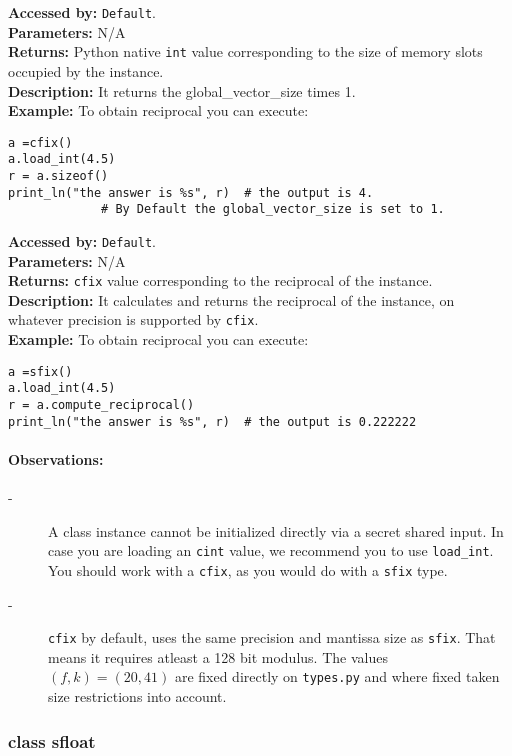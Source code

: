 \textbf{Accessed by:} \verb|Default|.		 \\
\textbf{Parameters:} N/A \\
\textbf{Returns:}
Python native \verb|int| value corresponding to the size of memory slots occupied by the instance. \\
\textbf{Description:}
It returns the global_vector_size times 1. \\
\textbf{Example:}
To obtain reciprocal you can execute:
\begin{lstlisting}
a =cfix()
a.load_int(4.5)
r = a.sizeof()
print_ln("the answer is %s", r)  # the output is 4.
			 # By Default the global_vector_size is set to 1.
\end{lstlisting}
\textbf{Accessed by:} \verb|Default|.		 \\
\textbf{Parameters:} N/A \\
\textbf{Returns:} \verb|cfix| value corresponding to the reciprocal of the instance. \\
\textbf{Description:}
It calculates and returns the reciprocal of the instance, on whatever precision is supported by \verb|cfix|.\\
\textbf{Example:}
To obtain reciprocal you can execute:
\begin{lstlisting}
a =sfix()
a.load_int(4.5)
r = a.compute_reciprocal()
print_ln("the answer is %s", r)  # the output is 0.222222
\end{lstlisting}
\paragraph{Observations:}
\begin{description}
  \item[-] A class instance cannot be initialized directly via a secret shared input.
        In case you are loading an \verb|cint| value, we recommend you to use \verb|load_int|.
        You should work with a \verb|cfix|, as you would do with a \verb|sfix| type.
  \item[-]\verb|cfix| by default, uses the same precision and mantissa size as \verb|sfix|.
        That means it requires atleast a 128 bit modulus.
        The values $(f,k)=(20,41)$ are fixed directly on \verb|types.py| and where fixed taken size restrictions into account.
\end{description}

\subsubsection{class sfloat}

